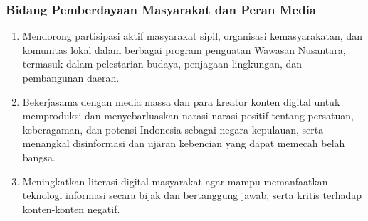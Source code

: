 \documentclass[12pt, a4paper]{article}
\begin{document}
\subsubsection*{Bidang Pemberdayaan Masyarakat dan Peran Media}
\begin{enumerate}
  \item Mendorong partisipasi aktif masyarakat sipil, organisasi kemasyarakatan, dan komunitas lokal dalam berbagai program penguatan Wawasan Nusantara, termasuk dalam pelestarian budaya, penjagaan lingkungan, dan pembangunan daerah.
  \item Bekerjasama dengan media massa dan para kreator konten digital untuk memproduksi dan menyebarluaskan narasi-narasi positif tentang persatuan, keberagaman, dan potensi Indonesia sebagai negara kepulauan, serta menangkal disinformasi dan ujaran kebencian yang dapat memecah belah bangsa.
  \item Meningkatkan literasi digital masyarakat agar mampu memanfaatkan teknologi informasi secara bijak dan bertanggung jawab, serta kritis terhadap konten-konten negatif.
\end{enumerate}
 
 
\end{document}
